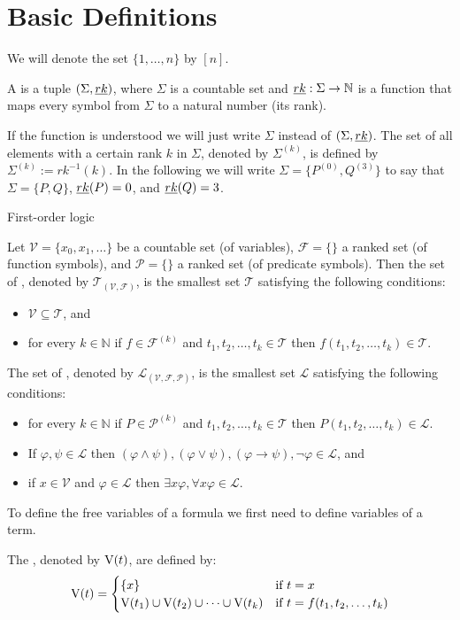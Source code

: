 \section{Basic Definitions}
We will denote the set $\{1,\dots,n\}$ by $\left[n\right]$.
\begin{definition}
A  is a tuple $(\Sigma,\emph{rk})$, where $\Sigma$ is a countable set and $\emph{rk}:\Sigma\to\mathbb{N}$ is a function that maps every symbol from $\Sigma$ to a natural number (its rank).
\end{definition}
If the function \rank{} is understood we will just write $\Sigma$ instead of $(\Sigma,\emph{rk})$. The set of all elements with a certain rank $k$ in $\Sigma$, denoted by $\Sigma^{(k)}$, is defined by $\Sigma^{(k)}:=rk^{-1}(k)$. In the following we will write $\Sigma=\{P^{(0)},Q^{(3)}\}$ to say that $\Sigma=\{P,Q\}$, $\emph{rk}(P)=0$, and $\emph{rk}(Q)=3$.

First-order logic
\begin{definition}
Let $\mathcal{V}=\{x_0,x_1,\dots\}$ be a countable set (of variables), $\mathcal{F}=\{\}$ a ranked set (of function symbols), and $\mathcal{P}=\{\}$ a ranked set (of predicate symbols). Then the set of , denoted by $\mathcal{T}_{(\mathcal{V},\mathcal{F})}$, is the smallest set $\mathcal{T}$ satisfying the following conditions:
\begin{itemize}
\item $\mathcal{V} \subseteq \mathcal{T}$, and
\item for every $k\in\mathbb{N}$ if $f\in\mathcal{F}^{(k)}$ and $t_1,t_2,\dots,t_k\in\mathcal{T}$ then $f(t_1,t_2,\dots,t_k)\in\mathcal{T}$.
\end{itemize}
The set of , denoted by $\mathcal{L}_{(\mathcal{V},\mathcal{F},\mathcal{P})}$, is the smallest set $\mathcal{L}$ satisfying the following conditions:
\begin{itemize}
\item for every $k\in\mathbb{N}$ if $P\in\mathcal{P}^{(k)}$ and $t_1,t_2,\dots,t_k\in\mathcal{T}$ then $P(t_1,t_2,\dots,t_k)\in\mathcal{L}$.
\item If $\varphi,\psi\in\mathcal{L}$ then $(\varphi\wedge\psi), (\varphi\vee\psi), (\varphi\to\psi), \neg \varphi\in\mathcal{L}$, and %
\item if $x\in\mathcal{V}$ and $\varphi\in\mathcal{L}$ then $\exists x\varphi,\forall x\varphi\in\mathcal{L}$. %
\end{itemize}
\end{definition}
To define the free variables of a formula we first need to define variables of a term.
\begin{definition}
The , denoted by $\text{V}(t)$, are defined by:
\[\text{V}(t)=
\begin{cases}
\{x\} & \text{if $t=x$}\\
\text{V}(t_1)\cup \text{V}(t_2)\cup\dots\cup \text{V}(t_k) & \text{if $t=f(t_1,t_2,\dots,t_k)$}
\end{cases}\]
\end{definition}

